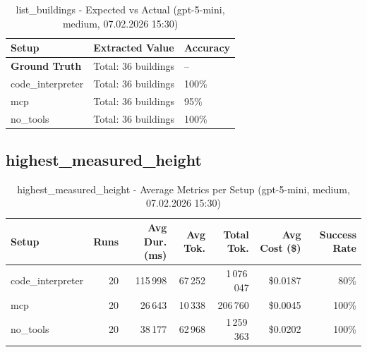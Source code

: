\documentclass[a4paper,11pt]{article}
\begin{document}
\begin{table}[H]
\centering
\scriptsize
\caption{list\_buildings - Expected vs Actual (gpt-5-mini, medium, 07.02.2026 15:30)}
\begin{tabular}{l l l}
\toprule
Setup & Extracted Value & Accuracy \\
\midrule
\textbf{Ground Truth} & Total: 36 buildings & -- \\
\midrule
code\_interpreter & Total: 36 buildings & 100\% \\
mcp & Total: 36 buildings & 95\% \\
no\_tools & Total: 36 buildings & 100\% \\
\bottomrule
\end{tabular}
\end{table}

\clearpage

\subsection{highest\_measured\_height}

\begin{table}[H]
\centering
\scriptsize
\caption{highest\_measured\_height - Average Metrics per Setup (gpt-5-mini, medium, 07.02.2026 15:30)}
\label{tab:combined\_highest\_measured\_height\_metrics\_20260207}
\begin{tabular}{l r r r r r r}
\toprule
Setup & Runs & Avg Dur. (ms) & Avg Tok. & Total Tok. & Avg Cost (\$) & Success Rate \\
\midrule
code\_interpreter & 20 & 115\,998 & 67\,252 & 1\,076\,047 & \$0.0187 & 80\% \\
mcp & 20 & 26\,643 & 10\,338 & 206\,760 & \$0.0045 & 100\% \\
no\_tools & 20 & 38\,177 & 62\,968 & 1\,259\,363 & \$0.0202 & 100\% \\
\bottomrule
\end{tabular}
\end{table}
\end{document}
